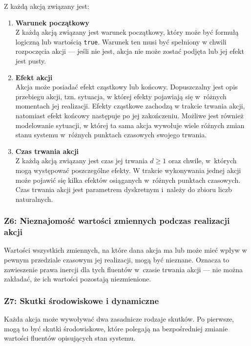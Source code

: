 \documentclass[12pt,a4paper]{article}
\begin{document}
Z każdą akcją związany jest:

\begin{enumerate}[label=\arabic*.]
    \item \textbf{Warunek początkowy} \\
    Z każdą akcją związany jest warunek początkowy, który może być formułą logiczną lub wartością \texttt{true}. Warunek ten musi być spełniony w chwili rozpoczęcia akcji --- jeśli nie jest, akcja nie może zostać podjęta lub jej efekt jest pusty.

    \item \textbf{Efekt akcji} \\
    Akcja może posiadać efekt cząstkowy lub końcowy. Dopuszczalny jest opis przebiegu akcji, tzn. sytuacja, w której efekty pojawiają się w~różnych momentach jej realizacji. Efekty cząstkowe zachodzą w trakcie trwania akcji, natomiast efekt końcowy następuje po jej zakończeniu. Możliwe jest również modelowanie sytuacji, w której ta sama akcja wywołuje wiele różnych zmian stanu systemu w~różnych punktach czasowych swojego trwania.

    \item \textbf{Czas trwania akcji} \\
    Z każdą akcją związany jest czas jej trwania $d \geq 1$ oraz chwile, w~których mogą występować poszczególne efekty. W trakcie wykonywania jednej akcji może pojawić się kilka efektów osiąganych w~różnych punktach czasowych. Czas trwania akcji jest parametrem dyskretnym i~należy do zbioru liczb naturalnych.
\end{enumerate}

\subsubsection*{Z6: Nieznajomość wartości zmiennych podczas realizacji akcji}

Wartości wszystkich zmiennych, na które dana akcja ma lub może mieć wpływ w pewnym przedziale czasowym jej realizacji, mogą być nieznane. Oznacza to zawieszenie prawa inercji dla tych fluentów w~czasie trwania akcji --- nie można zakładać, że ich wartości pozostają niezmienione.

\subsubsection*{Z7: Skutki środowiskowe i dynamiczne}

Każda akcja może wywoływać dwa zasadnicze rodzaje skutków. Po pierwsze, mogą to być skutki środowiskowe, które polegają na bezpośredniej zmianie wartości fluentów opisujących stan systemu. 
\end{document}
